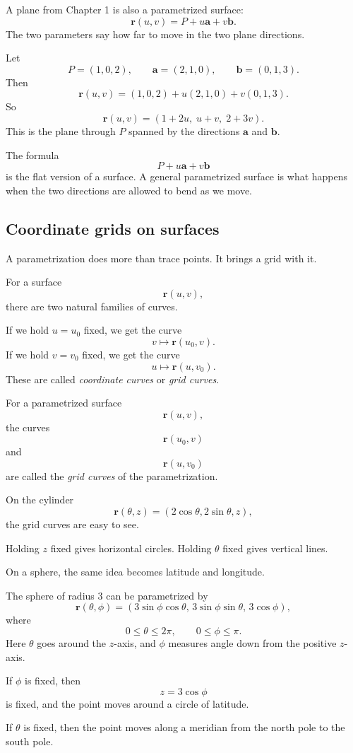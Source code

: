 A plane from Chapter 1 is also a parametrized surface:
\[
    \mathbf r(u,v)=P+u\mathbf a+v\mathbf b.
\]
The two parameters say how far to move in the two plane directions.

\begin{example}
Let
\[
    P=(1,0,2),\qquad \mathbf a=(2,1,0),\qquad \mathbf b=(0,1,3).
\]
Then
\[
    \mathbf r(u,v)
    =
    (1,0,2)+u(2,1,0)+v(0,1,3).
\]
So
\[
    \mathbf r(u,v)=(1+2u,\;u+v,\;2+3v).
\]
This is the plane through \(P\) spanned by the directions \(\mathbf a\) and
\(\mathbf b\).
\end{example}

The formula
\[
    P+u\mathbf a+v\mathbf b
\]
is the flat version of a surface.  A general parametrized surface is what happens when
the two directions are allowed to bend as we move.

\subsection{Coordinate grids on surfaces}

A parametrization does more than trace points.  It brings a grid with it.

For a surface
\[
    \mathbf r(u,v),
\]
there are two natural families of curves.

If we hold \(u=u_0\) fixed, we get the curve
\[
    v\mapsto \mathbf r(u_0,v).
\]
If we hold \(v=v_0\) fixed, we get the curve
\[
    u\mapsto \mathbf r(u,v_0).
\]
These are called \emph{coordinate curves} or \emph{grid curves}.

\begin{definition}
For a parametrized surface
\[
    \mathbf r(u,v),
\]
the curves
\[
    \mathbf r(u_0,v)
\]
and
\[
    \mathbf r(u,v_0)
\]
are called the \emph{grid curves} of the parametrization.
\end{definition}

On the cylinder
\[
    \mathbf r(\theta,z)=(2\cos\theta,2\sin\theta,z),
\]
the grid curves are easy to see.

Holding \(z\) fixed gives horizontal circles.  Holding \(\theta\) fixed gives vertical
lines.

On a sphere, the same idea becomes latitude and longitude.

\begin{example}
The sphere of radius \(3\) can be parametrized by
\[
    \mathbf r(\theta,\phi)
    =
    (3\sin\phi\cos\theta,\,
     3\sin\phi\sin\theta,\,
     3\cos\phi),
\]
where
\[
    0\le\theta\le2\pi,\qquad 0\le\phi\le\pi.
\]
Here \(\theta\) goes around the \(z\)-axis, and \(\phi\) measures angle down from the
positive \(z\)-axis.

If \(\phi\) is fixed, then
\[
    z=3\cos\phi
\]
is fixed, and the point moves around a circle of latitude.

If \(\theta\) is fixed, then the point moves along a meridian from the north pole to the
south pole.
\end{example}

